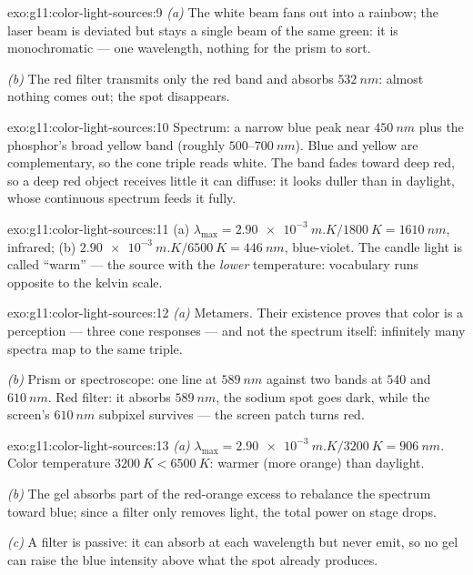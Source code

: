 \begin{solution}{exo:g11:color-light-sources:9}
\emph{(a)} The white beam fans out into a rainbow; the laser beam is
deviated but stays a single beam of the same green: it is monochromatic
--- one wavelength, nothing for the prism to sort.

\emph{(b)} The red filter transmits only the red band and absorbs
$\qty{532}{nm}$: almost nothing comes out; the spot disappears.
\end{solution}

\begin{solution}{exo:g11:color-light-sources:10}
Spectrum: a narrow blue peak near $\qty{450}{nm}$ plus the phosphor's
broad yellow band (roughly $500$--$\qty{700}{nm}$). Blue and yellow are
complementary, so the cone triple reads white. The band fades toward
deep red, so a deep red object receives little it can diffuse: it looks
duller than in daylight, whose continuous spectrum feeds it fully.
\end{solution}

\begin{solution}{exo:g11:color-light-sources:11}
(a) $\lambda_{\max} = \qty{2.90e-3}{m.K}/\qty{1800}{K}
= \qty{1610}{nm}$, infrared;
(b) $\qty{2.90e-3}{m.K}/\qty{6500}{K} = \qty{446}{nm}$, blue-violet.
The candle light is called ``warm'' --- the source with the
\emph{lower} temperature: vocabulary runs opposite to the kelvin scale.
\end{solution}

\begin{solution}{exo:g11:color-light-sources:12}
\emph{(a)} Metamers. Their existence proves that color is a perception
--- three cone responses --- and not the spectrum itself: infinitely
many spectra map to the same triple.

\emph{(b)} Prism or spectroscope: one line at $\qty{589}{nm}$ against
two bands at $540$ and $\qty{610}{nm}$. Red filter: it absorbs
$\qty{589}{nm}$, the sodium spot goes dark, while the screen's
$\qty{610}{nm}$ subpixel survives --- the screen patch turns red.
\end{solution}

\begin{solution}{exo:g11:color-light-sources:13}
\emph{(a)} $\lambda_{\max} = \qty{2.90e-3}{m.K}/\qty{3200}{K} =
\qty{906}{nm}$. Color temperature $\qty{3200}{K} < \qty{6500}{K}$:
warmer (more orange) than daylight.

\emph{(b)} The gel absorbs part of the red-orange excess to rebalance
the spectrum toward blue; since a filter only removes light, the total
power on stage drops.

\emph{(c)} A filter is passive: it can absorb at each wavelength but
never emit, so no gel can raise the blue intensity above what the spot
already produces.
\end{solution}


